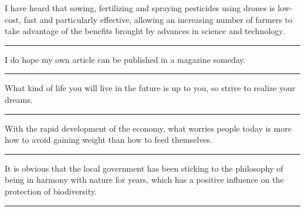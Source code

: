 \documentclass[11pt,a4paper]{article}
\newcommand{\num}[1]{\makebox[1.9em][r]{#1.}\hspace{0.3em}}
\newcommand{\wline}{\noindent\rule{\linewidth}{0.4pt}}
\begin{document}
\begin{minipage}{\linewidth}

\num{24}I have heard that sowing, fertilizing and spraying pesticides using drones is low-cost, fast and particularly effective, allowing an increasing number of farmers to take advantage of the benefits brought by advances in science and technology.

\vspace{0.25em}

\wline

\end{minipage}

\vspace{0.35em}\vspace{0.15em}

\begin{minipage}{\linewidth}

\num{25}I do hope my own article can be published in a magazine someday.

\vspace{0.25em}

\wline

\end{minipage}

\begin{minipage}{\linewidth}

\num{26}What kind of life you will live in the future is up to you, so strive to realize your dreams.

\vspace{0.25em}

\wline

\end{minipage}

\begin{minipage}{\linewidth}

\num{27}With the rapid development of the economy, what worries people today is more how to avoid gaining weight than how to feed themselves.

\vspace{0.25em}

\wline

\end{minipage}

\begin{minipage}{\linewidth}

\num{28}It is obvious that the local government has been sticking to the philosophy of being in harmony with nature for years, which has a positive influence on the protection of biodiversity.

\vspace{0.25em}

\wline

\end{minipage}
\end{document}
